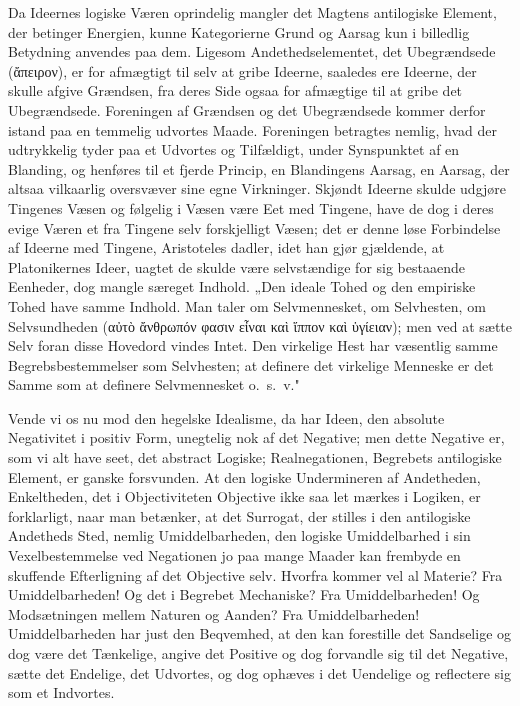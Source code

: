 \documentclass[12pt]{book}
\newcommand{\opage}[1]{\marginnote{\footnotesize\textit{[#1]}}}
\begin{document}
Da Ideernes logiske Væren oprindelig mangler det Magtens antilogiske Element, der betinger
Energien, kunne Kategorierne Grund og Aarsag kun i billedlig Betydning anvendes paa dem. Ligesom
Andethedselementet, det Ubegrændsede (ἄπειρον), er for afmægtigt til selv at gribe Ideerne,
saaledes ere Ideerne, der skulle afgive Grændsen, fra deres Side ogsaa for afmægtige til at gribe
det Ubegrændsede. Foreningen af Grændsen og det Ubegrændsede kommer derfor istand paa en
temmelig udvortes Maade. Foreningen betragtes nemlig, hvad der udtrykkelig tyder paa et Udvortes
og Tilfældigt, under Synspunktet af en Blanding, og henføres til et fjerde Princip, en Blandingens
Aarsag, en Aarsag, der altsaa vilkaarlig oversvæver sine egne Virkninger. Skjøndt Ideerne skulde
udgjøre Tingenes Væsen og følgelig i Væsen være Eet med Tingene, have de dog i deres evige Væren
et fra Tingene selv forskjelligt Væsen; det er denne løse Forbindelse af Ideerne med Tingene,
Aristoteles dadler, idet han gjør gjældende, at Platonikernes Ideer, uagtet de skulde være
selvstændige for sig bestaaende Eenheder, dog mangle særeget Indhold. „Den ideale Tohed og den
empiriske Tohed have samme Indhold. Man taler om Selvmennesket, om Selvhesten, om Selvsundheden
(αὐτὸ ἄνθρωπόν φασιν εἶναι καὶ ἵππον καὶ ὑγίειαν); men ved at sætte Selv foran disse Hovedord
vindes Intet. Den virkelige Hest har væsentlig samme Begrebsbestemmelser som Selvhesten; at
definere det virkelige Menneske er det Samme som at definere Selvmennesket o.\ s.\ v."

Vende vi os nu mod den hegelske Idealisme, da har Ideen, den absolute Negativitet i positiv Form,
unegtelig nok af det Negative; men dette Negative er, som vi alt have seet,
\opage{186} det abstract Logiske; Realnegationen, Begrebets antilogiske Element, er ganske forsvunden. At den
logiske Undermineren af Andetheden, Enkeltheden, det i Objectiviteten Objective ikke saa let
mærkes i Logiken, er forklarligt, naar man betænker, at det Surrogat, der stilles i den
antilogiske Andetheds Sted, nemlig Umiddelbarheden, den logiske Umiddelbarhed i sin
Vexelbestemmelse ved Negationen jo paa mange Maader kan frembyde en skuffende Efterligning af det
Objective selv. Hvorfra kommer vel al Materie? Fra Umiddelbarheden! Og det i Begrebet Mechaniske?
Fra Umiddelbarheden! Og Modsætningen mellem Naturen og Aanden? Fra Umiddelbarheden!
Umiddelbarheden har just den Beqvemhed, at den kan forestille det Sandselige og dog være det
Tænkelige, angive det Positive og dog forvandle sig til det Negative, sætte det Endelige, det
Udvortes, og dog ophæves i det Uendelige og reflectere sig som et Indvortes.
\end{document}
